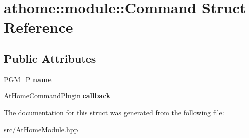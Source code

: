 \hypertarget{structathome_1_1module_1_1_command}{}\section{athome\+:\+:module\+:\+:Command Struct Reference}
\label{structathome_1_1module_1_1_command}
\subsection*{Public Attributes}
\begin{DoxyCompactItemize}
\item 
\mbox{\label{structathome_1_1module_1_1_command_a08902ab3fe790172925627e054a31085}} 
P\+G\+M\+\_\+P {\bfseries name}
\item 
\mbox{\label{structathome_1_1module_1_1_command_adce00bca0f831799bfdd7a5265c997f2}} 
At\+Home\+Command\+Plugin {\bfseries callback}
\end{DoxyCompactItemize}


The documentation for this struct was generated from the following file\+:\begin{DoxyCompactItemize}
\item 
src/At\+Home\+Module.\+hpp\end{DoxyCompactItemize}
